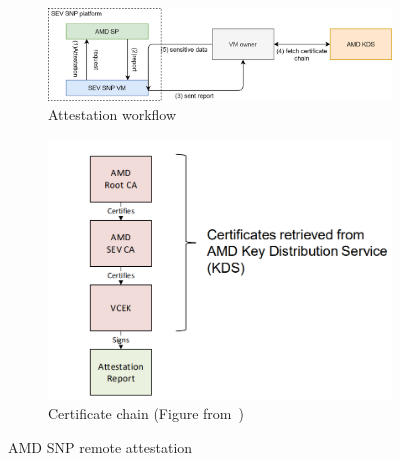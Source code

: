 \begin{figure}[htp]
  \centering
  \begin{subfigure}[b]{0.65\textwidth}
      \centering
      \includegraphics[width=\textwidth]{images/amd_attestation_workflow.PNG}
      \caption{Attestation workflow}
      \label{fig:amd_attestation_workflow}
  \end{subfigure}
  \hfill
  \begin{subfigure}[b]{0.3\textwidth}
      \centering
      \includegraphics[width=\textwidth]{images/amd_snp_certificate_chain.PNG}
      \caption{Certificate chain (Figure from~\cite*{amd_Sev_snp_ppt})}
      \label{fig:amd_snp_certificate_chain}
  \end{subfigure}
  \hfill
     \caption[AMD SNP remote attestation]{AMD SNP remote attestation}
     \label{fig:amd_snp_atteation}
\end{figure}

